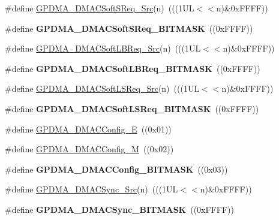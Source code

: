 \begin{DoxyCompactItemize}
\item 
\#define \hyperlink{group___g_p_d_m_a___private___macros_gabadcdf558c673120a035fc4610a46c68}{\-G\-P\-D\-M\-A\-\_\-\-D\-M\-A\-C\-Soft\-S\-Req\-\_\-\-Src}(n)~(((1\-U\-L$<$$<$n)\&0x\-F\-F\-F\-F))
\item 
\hypertarget{group___g_p_d_m_a___private___macros_ga8dd9af9fe86fc43a7f0d338d8ce5d3a3}{\#define {\bfseries \-G\-P\-D\-M\-A\-\_\-\-D\-M\-A\-C\-Soft\-S\-Req\-\_\-\-B\-I\-T\-M\-A\-S\-K}~((0x\-F\-F\-F\-F))}\label{group___g_p_d_m_a___private___macros_ga8dd9af9fe86fc43a7f0d338d8ce5d3a3}

\item 
\#define \hyperlink{group___g_p_d_m_a___private___macros_ga2b5d3aaa41f4949976637714b680ff9e}{\-G\-P\-D\-M\-A\-\_\-\-D\-M\-A\-C\-Soft\-L\-B\-Req\-\_\-\-Src}(n)~(((1\-U\-L$<$$<$n)\&0x\-F\-F\-F\-F))
\item 
\hypertarget{group___g_p_d_m_a___private___macros_gaa0605315bd0fe0ec2aa63bf0303b5d3a}{\#define {\bfseries \-G\-P\-D\-M\-A\-\_\-\-D\-M\-A\-C\-Soft\-L\-B\-Req\-\_\-\-B\-I\-T\-M\-A\-S\-K}~((0x\-F\-F\-F\-F))}\label{group___g_p_d_m_a___private___macros_gaa0605315bd0fe0ec2aa63bf0303b5d3a}

\item 
\#define \hyperlink{group___g_p_d_m_a___private___macros_ga20d3cc1b7ee1ef51c084865f0612319c}{\-G\-P\-D\-M\-A\-\_\-\-D\-M\-A\-C\-Soft\-L\-S\-Req\-\_\-\-Src}(n)~(((1\-U\-L$<$$<$n)\&0x\-F\-F\-F\-F))
\item 
\hypertarget{group___g_p_d_m_a___private___macros_gaff5ec4cd09ac62f7a853004f39756806}{\#define {\bfseries \-G\-P\-D\-M\-A\-\_\-\-D\-M\-A\-C\-Soft\-L\-S\-Req\-\_\-\-B\-I\-T\-M\-A\-S\-K}~((0x\-F\-F\-F\-F))}\label{group___g_p_d_m_a___private___macros_gaff5ec4cd09ac62f7a853004f39756806}

\item 
\#define \hyperlink{group___g_p_d_m_a___private___macros_ga253822f2712564a42379a76d9447cde4}{\-G\-P\-D\-M\-A\-\_\-\-D\-M\-A\-C\-Config\-\_\-\-E}~((0x01))
\item 
\#define \hyperlink{group___g_p_d_m_a___private___macros_ga0f2a7e8c8704f5a897f911ac3a8617e3}{\-G\-P\-D\-M\-A\-\_\-\-D\-M\-A\-C\-Config\-\_\-\-M}~((0x02))
\item 
\hypertarget{group___g_p_d_m_a___private___macros_gad882001a1a177628f45ffa5a57a2c894}{\#define {\bfseries \-G\-P\-D\-M\-A\-\_\-\-D\-M\-A\-C\-Config\-\_\-\-B\-I\-T\-M\-A\-S\-K}~((0x03))}\label{group___g_p_d_m_a___private___macros_gad882001a1a177628f45ffa5a57a2c894}

\item 
\#define \hyperlink{group___g_p_d_m_a___private___macros_ga0de1ad98ee0448636c62548801f368bf}{\-G\-P\-D\-M\-A\-\_\-\-D\-M\-A\-C\-Sync\-\_\-\-Src}(n)~(((1\-U\-L$<$$<$n)\&0x\-F\-F\-F\-F))
\item 
\hypertarget{group___g_p_d_m_a___private___macros_gad7e0221fb35906379b2eecbf0b5bb38b}{\#define {\bfseries \-G\-P\-D\-M\-A\-\_\-\-D\-M\-A\-C\-Sync\-\_\-\-B\-I\-T\-M\-A\-S\-K}~((0x\-F\-F\-F\-F))}\label{group___g_p_d_m_a___private___macros_gad7e0221fb35906379b2eecbf0b5bb38b}


\end{DoxyCompactItemize}
